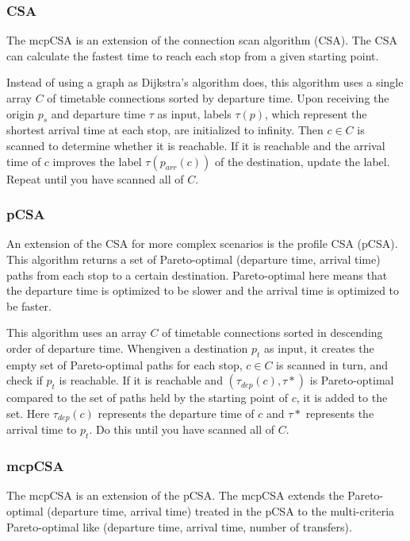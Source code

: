 \documentclass[conference]{IEEEtran}
\begin{document}
\subsubsection{CSA} 
\par The mcpCSA is an extension of the connection scan algorithm (CSA).
The CSA can calculate the fastest time to reach each stop from a given starting point.
\par Instead of using a graph as Dijkstra's algorithm does, this algorithm uses a single array $C$ of timetable connections sorted by departure time.
Upon receiving the origin $p_s$ and departure time $\tau$ as input, labels $\tau(p)$, which represent the shortest arrival time at each stop, are initialized to infinity.
Then $c \in C$ is scanned to determine whether it is reachable.
If it is reachable and the arrival time of $c$ improves the label $\tau(p_{arr}(c))$ of the destination, update the label.
Repeat until you have scanned all of $C$.

\subsubsection{pCSA}
\par An extension of the CSA for more complex scenarios is the profile CSA (pCSA).
This algorithm returns a set of Pareto-optimal (departure time, arrival time) paths from each stop to a certain destination.
Pareto-optimal here means that the departure time is optimized to be slower and the arrival time is optimized to be faster.
\par This algorithm uses an array $C$ of timetable connections sorted in descending order of departure time.
Whengiven a destination $p_t$ as input, it creates the empty set of Pareto-optimal paths for each stop,
$c \in C$ is scanned in turn, and check if $p_t$ is reachable.
If it is reachable and $(\tau_{dep}(c), \tau\ast)$ is Pareto-optimal compared to the set of paths held by the starting point of $c$, it is added to the set.
Here $\tau_{dep}(c)$ represents the departure time of $c$ and $\tau\ast$ represents the arrival time to $p_t$.
Do this until you have scanned all of $C$.

\subsubsection{mcpCSA}
\par The mcpCSA is an extension of the pCSA.
The mcpCSA extends the Pareto-optimal (departure time, arrival time) treated in the pCSA to the multi-criteria Pareto-optimal like (departure time, arrival time, number of transfers).
\end{document}
